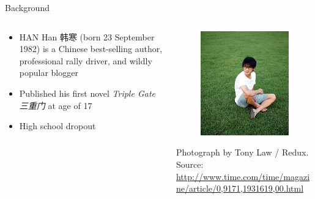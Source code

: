 \documentclass[12pt]{beamer}
\newcommand{\1}[1]{{\mathbf 1}\left\{#1\right\}}        %
\begin{document}
\begin{frame}{Background}

\note{
}

 \begin{columns}[t]
 \begin{column}{0.6\textwidth}

	\begin{itemize}[<+->]
	\item  HAN Han 韩寒 (born 23 September 1982) is a Chinese best-selling author, professional rally driver, and  wildly  popular blogger
	\item Published his first novel {\em Triple Gate 三重门} at age of 17
	\item High school dropout
	\end{itemize}

 \end{column}
 
 \begin{column}{0.45\textwidth}
	\begin{figure}
	  \centering
	  \includegraphics[scale=0.4]{han_han.jpg} 
	\end{figure}

{\tiny Photograph by Tony Law / Redux. Source: \url{http://www.time.com/time/magazine/article/0,9171,1931619,00.html}}
 \end{column}
 
 \end{columns}

\end{frame}
\end{document}
